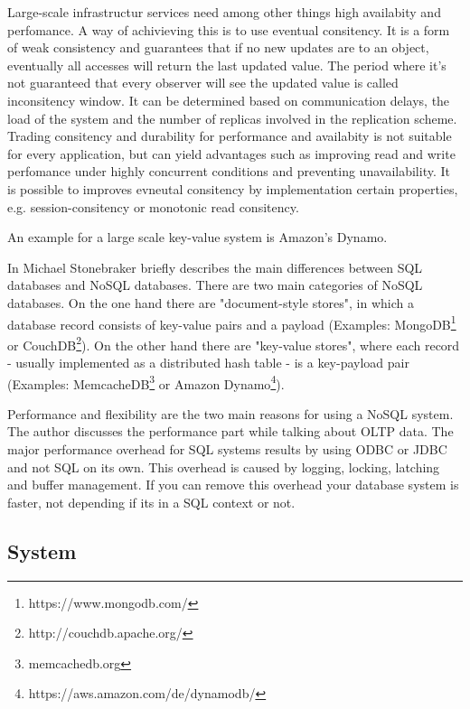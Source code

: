 \begin{packed_enum}
\item 
Large-scale infrastructur services need among other things high availabity and perfomance. A way of achivieving this is to use eventual consitency. It is a form of weak consistency and guarantees that if no new updates are to an object, eventually all accesses will return the last updated value. The period where it's not guaranteed that every observer will see the updated value is called inconsitency window. It can be determined based on communication delays, the load of the system and the number of replicas involved in the replication scheme.  
Trading consitency and durability for performance and availabity is not suitable for every application, but can yield advantages such as improving read and write perfomance under highly concurrent conditions and preventing unavailability. It is possible to improves evneutal consitency 
by implementation certain properties, e.g. session-consitency or monotonic read consitency. 

An example for a large scale key-value system is Amazon's Dynamo. \cite{Vogels2009}

\item
In \cite{Stonebraker2010} Michael Stonebraker briefly describes the main differences between SQL databases and NoSQL databases. There are two main categories of NoSQL databases. On the one hand there are "document-style stores", in which a database record consists of key-value pairs and a payload (Examples: MongoDB\footnote{https://www.mongodb.com/} or CouchDB\footnote{http://couchdb.apache.org/}). On the other hand there are "key-value stores", where each record - usually implemented as a distributed hash table - is a key-payload pair (Examples: MemcacheDB\footnote{memcachedb.org} or Amazon Dynamo\footnote{https://aws.amazon.com/de/dynamodb/}).

Performance and flexibility are the two main reasons for using a NoSQL system. The author discusses the performance part while talking about OLTP data. The major performance overhead for SQL systems results by using ODBC or JDBC and not SQL on its own. This overhead is caused by logging, locking, latching and buffer management. If you can remove this overhead your database system is faster, not depending if its in a SQL context or not.


\end{packed_enum}

\subsection{System}

